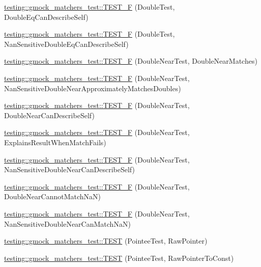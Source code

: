 \begin{DoxyCompactItemize}
\hyperlink{namespacetesting_1_1gmock__matchers__test_a5975fb5a50e5364fe21422093680a559}{testing\+::gmock\+\_\+matchers\+\_\+test\+::\+T\+E\+S\+T\+\_\+F} (Double\+Test, Double\+Eq\+Can\+Describe\+Self)
\item 
\hyperlink{namespacetesting_1_1gmock__matchers__test_a2d101d1823617f9b1346ee64cdce5216}{testing\+::gmock\+\_\+matchers\+\_\+test\+::\+T\+E\+S\+T\+\_\+F} (Double\+Test, Nan\+Sensitive\+Double\+Eq\+Can\+Describe\+Self)
\item 
\hyperlink{namespacetesting_1_1gmock__matchers__test_ab2949593472038919b8f3e1b2da204bc}{testing\+::gmock\+\_\+matchers\+\_\+test\+::\+T\+E\+S\+T\+\_\+F} (Double\+Near\+Test, Double\+Near\+Matches)
\item 
\hyperlink{namespacetesting_1_1gmock__matchers__test_add8765ad2bb98f4b064ee77b4c21a612}{testing\+::gmock\+\_\+matchers\+\_\+test\+::\+T\+E\+S\+T\+\_\+F} (Double\+Near\+Test, Nan\+Sensitive\+Double\+Near\+Approximately\+Matches\+Doubles)
\item 
\hyperlink{namespacetesting_1_1gmock__matchers__test_a31d14a68cacbaab3fafd26247cc11f9c}{testing\+::gmock\+\_\+matchers\+\_\+test\+::\+T\+E\+S\+T\+\_\+F} (Double\+Near\+Test, Double\+Near\+Can\+Describe\+Self)
\item 
\hyperlink{namespacetesting_1_1gmock__matchers__test_a4250d3de38128f3452a0a9e93173bdb4}{testing\+::gmock\+\_\+matchers\+\_\+test\+::\+T\+E\+S\+T\+\_\+F} (Double\+Near\+Test, Explains\+Result\+When\+Match\+Fails)
\item 
\hyperlink{namespacetesting_1_1gmock__matchers__test_ad147bef4b26c0a060cb4d25fe517a3e3}{testing\+::gmock\+\_\+matchers\+\_\+test\+::\+T\+E\+S\+T\+\_\+F} (Double\+Near\+Test, Nan\+Sensitive\+Double\+Near\+Can\+Describe\+Self)
\item 
\hyperlink{namespacetesting_1_1gmock__matchers__test_a9542b930e1de4d087a8655855edcc13c}{testing\+::gmock\+\_\+matchers\+\_\+test\+::\+T\+E\+S\+T\+\_\+F} (Double\+Near\+Test, Double\+Near\+Cannot\+Match\+NaN)
\item 
\hyperlink{namespacetesting_1_1gmock__matchers__test_a7c8d850697cb6cc030a4b05eeecffb72}{testing\+::gmock\+\_\+matchers\+\_\+test\+::\+T\+E\+S\+T\+\_\+F} (Double\+Near\+Test, Nan\+Sensitive\+Double\+Near\+Can\+Match\+NaN)
\item 
\hyperlink{namespacetesting_1_1gmock__matchers__test_ad6a13303d164fa9ca035a137840b78cb}{testing\+::gmock\+\_\+matchers\+\_\+test\+::\+T\+E\+ST} (Pointee\+Test, Raw\+Pointer)
\item 
\hyperlink{namespacetesting_1_1gmock__matchers__test_a84a21ee7de697401049cb932f859ee33}{testing\+::gmock\+\_\+matchers\+\_\+test\+::\+T\+E\+ST} (Pointee\+Test, Raw\+Pointer\+To\+Const)

\end{DoxyCompactItemize}
